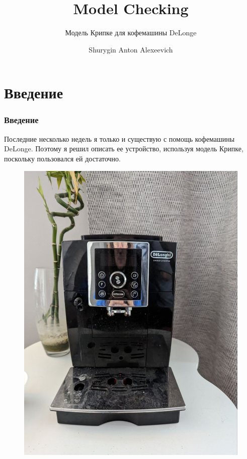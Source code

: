 \documentclass[xcolor={dvipsnames}]{beamer}
\title[About Beamer] %
{Model Checking}
\subtitle{Модель Крипке для кофемашины DeLonge}
\author[] %
{Shurygin Anton Alexeevich}
\begin{document}
\frame{\titlepage}



\section{Введение}

\begin{frame}
\frametitle{Введение}

Последние несколько недель я только и существую с помощь кофемашины DeLonge. Поэтому я решил описать ее устройство, используя модель Крипке, поскольку пользовался ей достаточно.

\begin{figure}[h!]
    \begin{center}
    \begin{minipage}[h!]{0.3\linewidth}
        \includegraphics[width=1\linewidth]{pics/delonge1.jpg}

\end{minipage}
\end{center}
\end{figure}
\end{frame}
\end{document}
